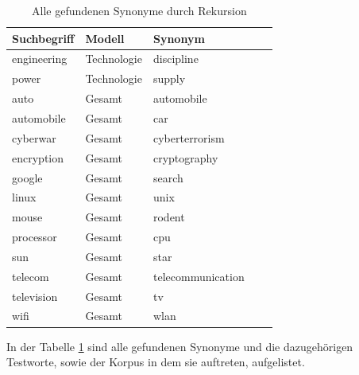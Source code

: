 \documentclass[12pt,a4paper]{report}
\begin{document}
\begin{table}[H]
\caption{Alle gefundenen Synonyme durch Rekursion}
\label{tab:bspsynoyme}
\begin{center}
\begin{tabular}{|l||l|l|l|l|}
\hline
\textbf{Suchbegriff} & \textbf{Modell} & \textbf{Synonym}   \\

\hline
 engineering & Technologie & discipline \\
 \hline	
 power	& Technologie	& supply	\\
 \hline
 \hline
auto & Gesamt & automobile\\
\hline
automobile & Gesamt & car\\
\hline
cyberwar & Gesamt & cyberterrorism\\
\hline
encryption & Gesamt & cryptography\\
\hline
google & Gesamt & search\\
\hline
linux & Gesamt & unix\\
\hline
mouse & Gesamt & rodent\\
\hline
processor & Gesamt & cpu\\
\hline
sun & Gesamt & star\\
\hline
telecom & Gesamt & telecommunication\\
\hline
television & Gesamt & tv\\
\hline
wifi & Gesamt & wlan\\
 	\hline
 
\end{tabular}
\end{center}
\end{table}
		
 In der Tabelle \ref{tab:bspsynoyme} sind alle gefundenen Synonyme und die dazugehörigen Testworte, sowie der Korpus in dem sie auftreten, aufgelistet.
		
\end{document}
